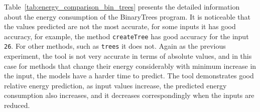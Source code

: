 Table~\ref{tab:energy_comparison_bin_trees} presents the detailed information about the energy consumption of the BinaryTrees program. It is noticeable that the values predicted are not the most accurate, for some inputs it has good accuracy, for example, the method \texttt{createTree} has good accuracy for the input \texttt{26}. For other methods, such as \texttt{trees} it does not. Again as the previous experiment, the tool is not very accurate in terms of absolute values, and in this case for methods that change their energy considerably with minimum increase in the input, the models have a harder time to predict. The tool demonstrates good relative energy prediction, as input values increase, the predicted energy consumption also increases, and it decreases correspondingly when the inputs are reduced.


